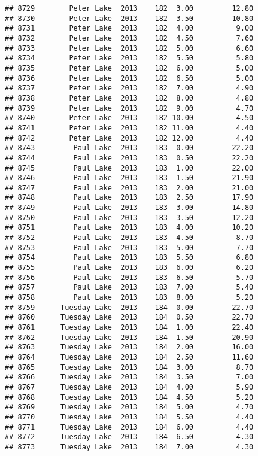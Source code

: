 \documentclass[
]{article}
\begin{document}
\begin{verbatim}
## 8729        Peter Lake  2013    182  3.00         12.80
## 8730        Peter Lake  2013    182  3.50         10.80
## 8731        Peter Lake  2013    182  4.00          9.00
## 8732        Peter Lake  2013    182  4.50          7.60
## 8733        Peter Lake  2013    182  5.00          6.60
## 8734        Peter Lake  2013    182  5.50          5.80
## 8735        Peter Lake  2013    182  6.00          5.00
## 8736        Peter Lake  2013    182  6.50          5.00
## 8737        Peter Lake  2013    182  7.00          4.90
## 8738        Peter Lake  2013    182  8.00          4.80
## 8739        Peter Lake  2013    182  9.00          4.70
## 8740        Peter Lake  2013    182 10.00          4.50
## 8741        Peter Lake  2013    182 11.00          4.40
## 8742        Peter Lake  2013    182 12.00          4.40
## 8743         Paul Lake  2013    183  0.00         22.20
## 8744         Paul Lake  2013    183  0.50         22.20
## 8745         Paul Lake  2013    183  1.00         22.00
## 8746         Paul Lake  2013    183  1.50         21.90
## 8747         Paul Lake  2013    183  2.00         21.00
## 8748         Paul Lake  2013    183  2.50         17.90
## 8749         Paul Lake  2013    183  3.00         14.80
## 8750         Paul Lake  2013    183  3.50         12.20
## 8751         Paul Lake  2013    183  4.00         10.20
## 8752         Paul Lake  2013    183  4.50          8.70
## 8753         Paul Lake  2013    183  5.00          7.70
## 8754         Paul Lake  2013    183  5.50          6.80
## 8755         Paul Lake  2013    183  6.00          6.20
## 8756         Paul Lake  2013    183  6.50          5.70
## 8757         Paul Lake  2013    183  7.00          5.40
## 8758         Paul Lake  2013    183  8.00          5.20
## 8759      Tuesday Lake  2013    184  0.00         22.70
## 8760      Tuesday Lake  2013    184  0.50         22.70
## 8761      Tuesday Lake  2013    184  1.00         22.40
## 8762      Tuesday Lake  2013    184  1.50         20.90
## 8763      Tuesday Lake  2013    184  2.00         16.00
## 8764      Tuesday Lake  2013    184  2.50         11.60
## 8765      Tuesday Lake  2013    184  3.00          8.70
## 8766      Tuesday Lake  2013    184  3.50          7.00
## 8767      Tuesday Lake  2013    184  4.00          5.90
## 8768      Tuesday Lake  2013    184  4.50          5.20
## 8769      Tuesday Lake  2013    184  5.00          4.70
## 8770      Tuesday Lake  2013    184  5.50          4.40
## 8771      Tuesday Lake  2013    184  6.00          4.40
## 8772      Tuesday Lake  2013    184  6.50          4.30
## 8773      Tuesday Lake  2013    184  7.00          4.30

\end{verbatim}
\end{document}
